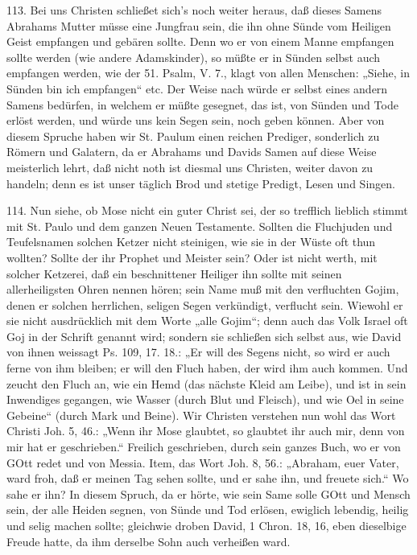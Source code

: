113. Bei uns Christen schließet sich’s noch weiter heraus, daß dieses Samens Abrahams Mutter müsse eine Jungfrau sein, die ihn ohne Sünde vom Heiligen Geist empfangen und gebären sollte. Denn wo er von einem Manne empfangen sollte werden (wie andere Adamskinder), so müßte er in Sünden selbst auch empfangen werden, wie der 51. Psalm, V. 7., klagt von allen Menschen: „Siehe, in Sünden bin ich empfangen“ etc. Der Weise nach würde er selbst eines andern Samens bedürfen, in welchem er müßte gesegnet, das ist, von Sünden und Tode erlöst werden, und würde uns kein Segen sein, noch geben können. Aber von diesem Spruche haben wir St. Paulum einen reichen Prediger, sonderlich zu Römern und Galatern, da er Abrahams und Davids Samen auf diese Weise meisterlich lehrt, daß nicht noth ist diesmal uns Christen, weiter davon zu handeln; denn es ist unser täglich Brod und stetige Predigt, Lesen und Singen.

114. Nun siehe, ob Mose nicht ein guter Christ sei, der so trefflich lieblich stimmt mit St. Paulo und dem ganzen Neuen Testamente. Sollten die Fluchjuden und Teufelsnamen solchen Ketzer nicht steinigen, wie sie in der Wüste oft thun wollten? Sollte der ihr Prophet und Meister sein? Oder ist nicht werth, mit solcher Ketzerei, daß ein beschnittener Heiliger ihn sollte mit seinen allerheiligsten Ohren nennen hören; sein Name muß mit den verfluchten Gojim, denen er solchen herrlichen, seligen Segen verkündigt, verflucht sein. Wiewohl er sie nicht ausdrücklich mit dem Worte „alle Gojim“; denn auch das Volk Israel oft Goj in der Schrift genannt wird; sondern sie schließen sich selbst aus, wie David von ihnen weissagt Ps. 109, 17. 18.: „Er will des Segens nicht, so wird er auch ferne von ihm bleiben; er will den Fluch haben, der wird ihm auch kommen. Und zeucht den Fluch an, wie ein Hemd (das nächste Kleid am Leibe), und ist in sein Inwendiges gegangen, wie Wasser (durch Blut und Fleisch), und wie Oel in seine Gebeine“ (durch Mark und Beine). Wir Christen verstehen nun wohl das Wort Christi Joh. 5, 46.: „Wenn ihr Mose glaubtet, so glaubtet ihr auch mir, denn von mir hat er geschrieben.“ Freilich geschrieben, durch sein ganzes Buch, wo er von GOtt redet und von Messia. Item, das Wort Joh. 8, 56.: „Abraham, euer Vater, ward froh, daß er meinen Tag sehen sollte, und er sahe ihn, und freuete sich.“ Wo sahe er ihn? In diesem Spruch, da er hörte, wie sein Same solle GOtt und Mensch sein, der alle Heiden segnen, von Sünde und Tod erlösen, ewiglich lebendig, heilig und selig machen sollte; gleichwie droben David, 1 Chron. 18, 16, eben dieselbige Freude hatte, da ihm derselbe Sohn auch verheißen ward.

